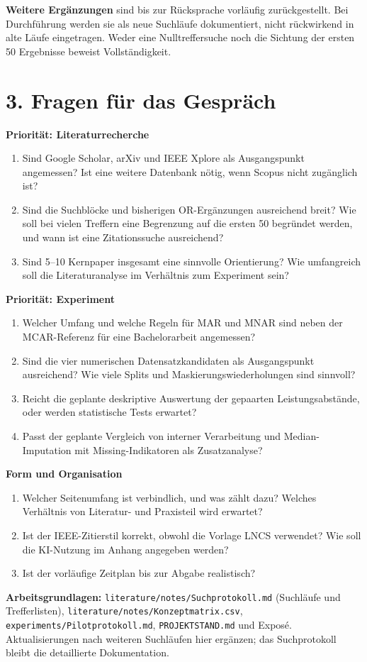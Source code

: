 \documentclass[11pt,a4paper]{article}
\begin{document}
\textbf{Weitere Ergänzungen} sind bis zur Rücksprache vorläufig
zurückgestellt. Bei Durchführung werden sie als neue Suchläufe dokumentiert,
nicht rückwirkend in alte Läufe eingetragen. Weder eine Nulltreffersuche noch
die Sichtung der ersten 50 Ergebnisse beweist Vollständigkeit.

\section*{3. Fragen für das Gespräch}

\textbf{Priorität: Literaturrecherche}
\begin{enumerate}
  \item Sind Google Scholar, arXiv und IEEE Xplore als Ausgangspunkt
  angemessen? Ist eine weitere Datenbank nötig, wenn Scopus nicht zugänglich
  ist?
  \item Sind die Suchblöcke und bisherigen OR-Ergänzungen ausreichend breit?
  Wie soll bei vielen Treffern eine Begrenzung auf die ersten 50 begründet
  werden, und wann ist eine Zitationssuche ausreichend?
  \item Sind 5--10 Kernpaper insgesamt eine sinnvolle Orientierung? Wie
  umfangreich soll die Literaturanalyse im Verhältnis zum Experiment sein?
\end{enumerate}

\textbf{Priorität: Experiment}
\begin{enumerate}[resume]
  \item Welcher Umfang und welche Regeln für MAR und MNAR sind neben der
  MCAR-Referenz für eine Bachelorarbeit angemessen?
  \item Sind die vier numerischen Datensatzkandidaten als Ausgangspunkt
  ausreichend? Wie viele Splits und Maskierungswiederholungen sind sinnvoll?
  \item Reicht die geplante deskriptive Auswertung der gepaarten
  Leistungsabstände, oder werden statistische Tests erwartet?
  \item Passt der geplante Vergleich von interner Verarbeitung und
  Median-Imputation mit Missing-Indikatoren als Zusatzanalyse?
\end{enumerate}

\textbf{Form und Organisation}
\begin{enumerate}[resume]
  \item Welcher Seitenumfang ist verbindlich, und was zählt dazu? Welches
  Verhältnis von Literatur- und Praxisteil wird erwartet?
  \item Ist der IEEE-Zitierstil korrekt, obwohl die Vorlage LNCS verwendet?
  Wie soll die KI-Nutzung im Anhang angegeben werden?
  \item Ist der vorläufige Zeitplan bis zur Abgabe realistisch?
\end{enumerate}

\textbf{Arbeitsgrundlagen:} \texttt{literature/notes/Suchprotokoll.md}
(Suchläufe und Trefferlisten), \texttt{literature/notes/Konzeptmatrix.csv},
\texttt{experiments/Pilotprotokoll.md}, \texttt{PROJEKTSTAND.md} und Exposé.
Aktualisierungen nach weiteren Suchläufen hier ergänzen; das Suchprotokoll
bleibt die detaillierte Dokumentation.
\end{document}
